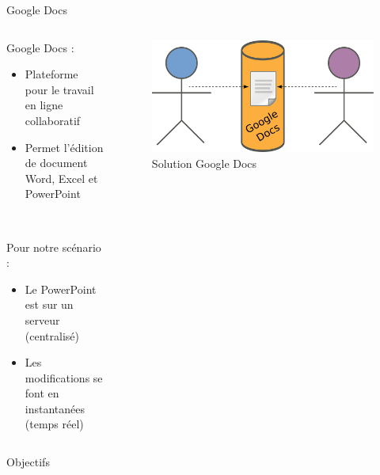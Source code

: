 \begin{frame}{Google Docs}
\begin{columns}
  \begin{column}{.5\textwidth}
  Google Docs :
  \begin{itemize}
    \item Plateforme pour le travail en ligne collaboratif
    \item Permet l'édition de document Word, Excel et PowerPoint
  \end{itemize}~

  Pour notre scénario :
  \begin{itemize}
    \item Le PowerPoint est sur un serveur (centralisé)
    \item Les modifications se font en instantanées (temps réel)
  \end{itemize}
  \end{column}

  \begin{column}{.45\textwidth}
  \begin{figure}
    \center
    \includegraphics[width=.9\textwidth]{includes/gdocs.pdf}
    \caption{Solution Google Docs}
  \end{figure}
  \end{column}
\end{columns}
\end{frame}

\begin{frame}{Objectifs}
\end{frame}

